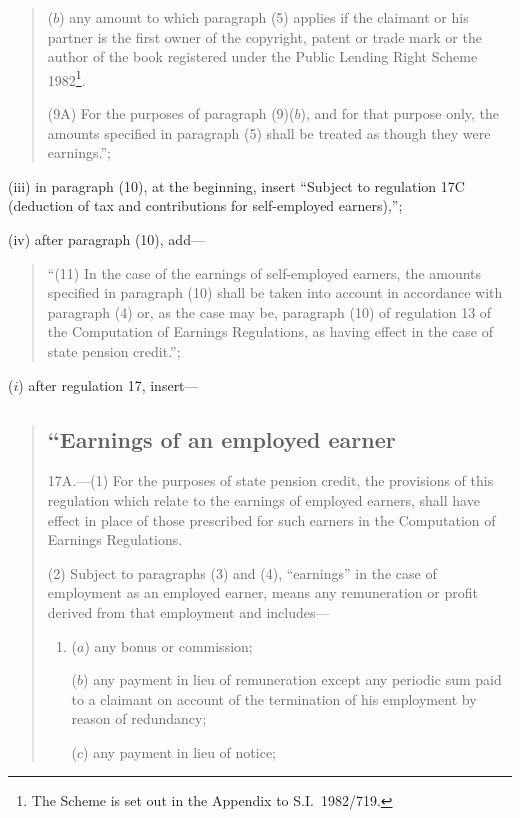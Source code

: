 \documentclass[12pt,a4paper]{article}
\begin{document}
\begin{enumerate}
\begin{enumerate}
\begin{quotation}
\begin{enumerate}
($b$) any amount to which paragraph (5) applies if the claimant or his partner is the first owner of the copyright, patent or trade mark or the author of the book registered under the Public Lending Right Scheme 1982\footnote{The Scheme is set out in the Appendix to S.I.\ 1982/719.}.
\end{enumerate}

(9A) For the purposes of paragraph (9)($b$), and for that purpose only, the amounts specified in paragraph (5) shall be treated as though they were earnings.”;
\end{quotation}

(iii) in paragraph (10), at the beginning, insert “Subject to regulation 17C (deduction of tax and contributions for self-employed earners),”;

(iv) after paragraph (10), add—
\begin{quotation}
“(11) In the case of the earnings of self-employed earners, the amounts specified in paragraph (10) shall be taken into account in accordance with paragraph (4) or, as the case may be, paragraph (10) of regulation 13 of the Computation of Earnings Regulations, as having effect in the case of state pension credit.”;
\end{quotation}
\end{enumerate}

($i$) after regulation 17, insert—
\begin{quotation}
\subsection*{“Earnings of an employed earner}

17A.---(1)  For the purposes of state pension credit, the provisions of this regulation which relate to the earnings of employed earners, shall have effect in place of those prescribed for such earners in the Computation of Earnings Regulations.

(2) Subject to paragraphs (3) and (4), “earnings” in the case of employment as an employed earner, means any remuneration or profit derived from that employment and includes—
\begin{enumerate}\item[]
($a$) any bonus or commission;

($b$) any payment in lieu of remuneration except any periodic sum paid to a claimant on account of the termination of his employment by reason of redundancy;

($c$) any payment in lieu of notice;


\end{enumerate}
\end{quotation}
\end{enumerate}
\end{document}
